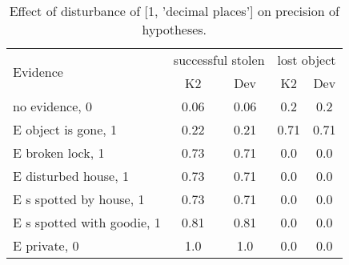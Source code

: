 \begin{table}\begin{tabular}{l|cc|cc}\toprule\multirow{2}{*}{Evidence} & \multicolumn{2}{c}{successful stolen}& \multicolumn{2}{c}{lost object}\\& {K2} & {Dev}& {K2} & {Dev}\\\midrule
no evidence, 0 & 0.06&0.06&0.2&0.2\\E object is gone, 1 & 0.22&0.21&0.71&0.71\\E broken lock, 1 & 0.73&0.71&0.0&0.0\\E disturbed house, 1 & 0.73&0.71&0.0&0.0\\E s spotted by house, 1 & 0.73&0.71&0.0&0.0\\E s spotted with goodie, 1 & 0.81&0.81&0.0&0.0\\E private, 0 & 1.0&1.0&0.0&0.0\\\bottomrule\end{tabular}\caption{Effect of disturbance of [1, 'decimal places'] on precision of hypotheses.}\end{table}